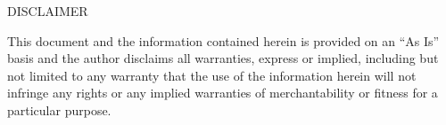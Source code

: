 \begin{center}
    {\Large DISCLAIMER}
\end{center}

This document and the information contained herein is provided on an ``As Is'' basis and the author disclaims all warranties, express or implied, including but not limited to any warranty that the use of the information herein will not infringe any rights or any implied warranties of merchantability or fitness for a particular purpose.
